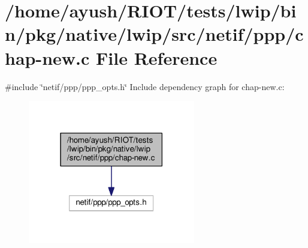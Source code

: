 \hypertarget{native_2lwip_2src_2netif_2ppp_2chap-new_8c}{}\section{/home/ayush/\+R\+I\+O\+T/tests/lwip/bin/pkg/native/lwip/src/netif/ppp/chap-\/new.c File Reference}
\label{native_2lwip_2src_2netif_2ppp_2chap-new_8c}
{\ttfamily \#include \char`\"{}netif/ppp/ppp\+\_\+opts.\+h\char`\"{}}\newline
Include dependency graph for chap-\/new.c\+:
\nopagebreak
\begin{figure}[H]
\begin{center}
\leavevmode
\includegraphics[width=207pt]{native_2lwip_2src_2netif_2ppp_2chap-new_8c__incl}
\end{center}
\end{figure}
